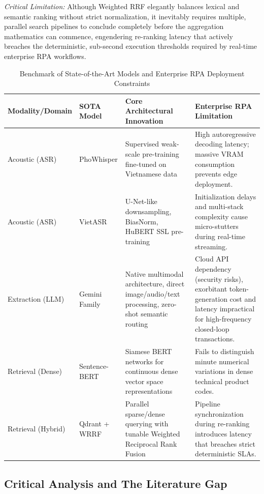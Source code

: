 \textit{Critical Limitation:} Although Weighted RRF elegantly balances lexical and semantic ranking without strict normalization, it inevitably requires multiple, parallel search pipelines to conclude completely before the aggregation mathematics can commence, engendering re-ranking latency that actively breaches the deterministic, sub-second execution thresholds required by real-time enterprise RPA workflows.

\begin{table}[H]
\centering
\small
\caption{Benchmark of State-of-the-Art Models and Enterprise RPA Deployment Constraints}
\label{tab:sota_rpa_gemini}
\begin{tabularx}{\textwidth}{@{} l l >{\raggedright\arraybackslash}X >{\raggedright\arraybackslash}X @{}}
\toprule
\textbf{Modality/Domain} & \textbf{SOTA Model} & \textbf{Core Architectural Innovation} & \textbf{Enterprise RPA Limitation} \\
\midrule
Acoustic (ASR) & PhoWhisper & Supervised weak-scale pre-training fine-tuned on Vietnamese data & High autoregressive decoding latency; massive VRAM consumption prevents edge deployment. \\
\addlinespace
Acoustic (ASR) & VietASR & U-Net-like downsampling, BiasNorm, HuBERT SSL pre-training & Initialization delays and multi-stack complexity cause micro-stutters during real-time streaming. \\
\addlinespace
Extraction (LLM) & Gemini Family & Native multimodal architecture, direct image/audio/text processing, zero-shot semantic routing & Cloud API dependency (security risks), exorbitant token-generation cost and latency impractical for high-frequency closed-loop transactions. \\
\addlinespace
Retrieval (Dense) & Sentence-BERT & Siamese BERT networks for continuous dense vector space representations & Fails to distinguish minute numerical variations in dense technical product codes. \\
\addlinespace
Retrieval (Hybrid) & Qdrant + WRRF & Parallel sparse/dense querying with tunable Weighted Reciprocal Rank Fusion & Pipeline synchronization during re-ranking introduces latency that breaches strict deterministic SLAs. \\
\bottomrule
\end{tabularx}
\end{table}

\subsection{Critical Analysis and The Literature Gap}
